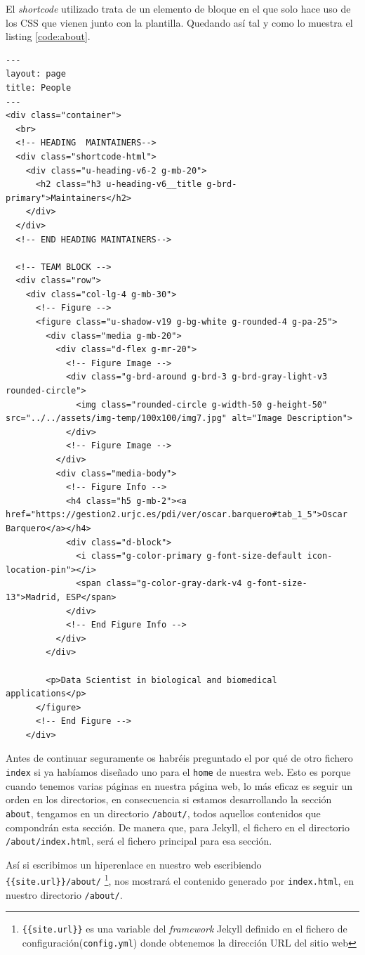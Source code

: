 El \textit{shortcode} utilizado trata de un elemento de bloque en el que solo hace uso de los CSS que vienen junto con la plantilla. Quedando así tal y como lo muestra el listing \ref{code:about}. 
\begin{lstlisting}[style=htmlcssjs,caption=index.html de About,label={code:about}]
---
layout: page
title: People
---
<div class="container">
  <br>
  <!-- HEADING  MAINTAINERS-->
  <div class="shortcode-html">
    <div class="u-heading-v6-2 g-mb-20">
      <h2 class="h3 u-heading-v6__title g-brd-primary">Maintainers</h2>
    </div>
  </div>
  <!-- END HEADING MAINTAINERS-->

  <!-- TEAM BLOCK -->
  <div class="row">
    <div class="col-lg-4 g-mb-30">
      <!-- Figure -->
      <figure class="u-shadow-v19 g-bg-white g-rounded-4 g-pa-25">
        <div class="media g-mb-20">
          <div class="d-flex g-mr-20">
            <!-- Figure Image -->
            <div class="g-brd-around g-brd-3 g-brd-gray-light-v3 rounded-circle">
              <img class="rounded-circle g-width-50 g-height-50" src="../../assets/img-temp/100x100/img7.jpg" alt="Image Description">
            </div>
            <!-- Figure Image -->
          </div>
          <div class="media-body">
            <!-- Figure Info -->
            <h4 class="h5 g-mb-2"><a href="https://gestion2.urjc.es/pdi/ver/oscar.barquero#tab_1_5">Oscar Barquero</a></h4>
            <div class="d-block">
              <i class="g-color-primary g-font-size-default icon-location-pin"></i>
              <span class="g-color-gray-dark-v4 g-font-size-13">Madrid, ESP</span>
            </div>
            <!-- End Figure Info -->
          </div>
        </div>

        <p>Data Scientist in biological and biomedical applications</p>
      </figure>
      <!-- End Figure -->
    </div>
\end{lstlisting}

Antes de continuar seguramente os habréis preguntado el por qué de otro fichero \texttt{index} si ya habíamos diseñado uno para el \texttt{home} de nuestra web. Esto es porque cuando tenemos varias páginas en nuestra página web, lo más eficaz es seguir un orden en los directorios, en consecuencia si estamos desarrollando la sección \texttt{about}, tengamos en un directorio \texttt{/about/}, todos aquellos contenidos que compondrán esta sección. De manera que, para Jekyll, el fichero en el directorio \texttt{/about/index.html}, será el fichero principal para esa sección.

Así si escribimos un hiperenlace en nuestro web escribiendo \texttt{\{\{site.url\}\}/about/} \footnote{\texttt{\{\{site.url\}\}} es una variable del \textit{framework} Jekyll definido en el fichero de configuración(\texttt{config.yml}) donde obtenemos la dirección URL del sitio web}, nos mostrará el contenido generado por \texttt{index.html}, en nuestro directorio \texttt{/about/}.


